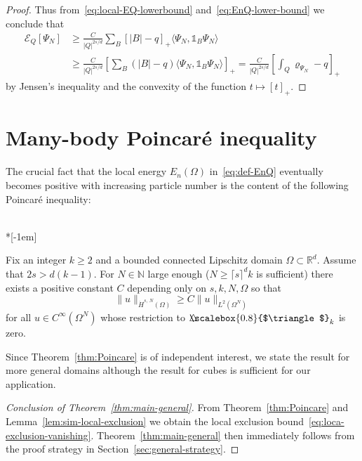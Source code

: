 \documentclass[AHL, Unicode, longabstracts, published]{cedram}
\newcommand*\N {\mathbb{N}}
\newcommand*\R {\mathbb{R}}
\newcommand\1{{\ensuremath {\mathds 1} }}
\newcommand{\cE}{\mathcal{E}}
\newcommand{\bDelta}{{\mbox{$\triangle$}\hspace{-8.6pt}\scalebox{0.8}{$\triangle$}}}
\begin{document}
\begin{proof}
Thus from~\eqref{eq:local-EQ-lowerbound} and~\eqref{eq:EnQ-lower-bound} we conclude that
\begin{align*}
\cE_Q[\Psi_N]&\ge
\frac{C}{|Q|^{2s/d}} \sum_{B} \left[|B|-q\right]_+ \langle \Psi_N, \1_B \Psi_N\rangle\\
&\ge
\frac{C}{|Q|^{2s/d}} \left[\sum_{B} (|B|-q) \langle \Psi_N, \1_B \Psi_N\rangle\right]_+
=
\frac{C}{|Q|^{2s/d}} \left[\int_{Q} \varrho_{\Psi_N} - q \right]_+
\end{align*}
by Jensen's inequality and the convexity of the function $t\mapsto [t]_+$.
\end{proof}


\section{Many-body Poincaré inequality} \label{sec:Poincare}

The crucial fact that the local energy $E_n(\Omega)$ in~\eqref{eq:def-EnQ} eventually becomes positive with increasing particle number is the content of the following Poincaré inequality:

\begin{theo}\label{thm:Poincare}\ \\*[-1em]

Fix an integer $k\geq 2$ and a bounded connected Lipschitz domain $\Omega\subset \R^d$. Assume that $2s>d(k-1)$. For $N \in \N$ large enough ($N \ge \lceil s \rceil^d k$ is sufficient) there exists a positive constant $C$ depending only on $s, k, N, \Omega$ so that
\begin{equation}\label{eq:Poincare_ineq_thm}
\|u\|_{\dot{H}^{s,\,N}(\Omega)}\geq C \|u\|_{L^2(\Omega^N)}
\end{equation}
for all $u\in C^\infty(\Omega^N)$ whose restriction to $\bDelta_k$ is zero.
\end{theo}

Since Theorem~\ref{thm:Poincare} is of independent interest, we state the result for more general domains although the result for cubes is sufficient for our application.

\begin{proof}[Conclusion of Theorem~\ref{thm:main-general}] From Theorem~\ref{thm:Poincare} and Lemma~\ref{lem:sim-local-exclusion} we obtain the local exclusion bound~\eqref{eq:loca-exclusion-vanishing}. Theorem~\ref{thm:main-general} then immediately follows from the proof strategy in Section~\ref{sec:general-strategy}.
\end{proof}
\end{document}
